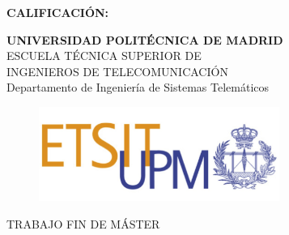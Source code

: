 {\large{\bf CALIFICACIÓN:}}
\pagestyle{empty}
\cleardoublepage
\vspace*{\baselineskip}
\begin{center}
	
	{\LARGE\rm\textbf{UNIVERSIDAD POLITÉCNICA DE MADRID}\\
	    \vspace{1.0cm}
	    ESCUELA TÉCNICA SUPERIOR DE\\ INGENIEROS DE TELECOMUNICACIÓN
	}   \\

	{\Large\rm Departamento de Ingeniería de Sistemas Telemáticos\\
	}  

    \begin{figure}[!htbp]
	    \centering
        \includegraphics[width=0.7\textwidth]{img/logo_etsit.jpg}
    \end{figure}
    
	\vspace{1.0cm}
    {\Large\rm TRABAJO FIN DE MÁSTER\\
	    \vspace{1.5cm}
        \MakeUppercase{ \textbf{\tfmtitle} } \\ 
	} 
	\vspace{1.0cm}
    \Large\rm\textbf{\authorname}\\ 
    \vspace{1.0cm}
    \fecha
\end{center}  

\cleardoublepage

